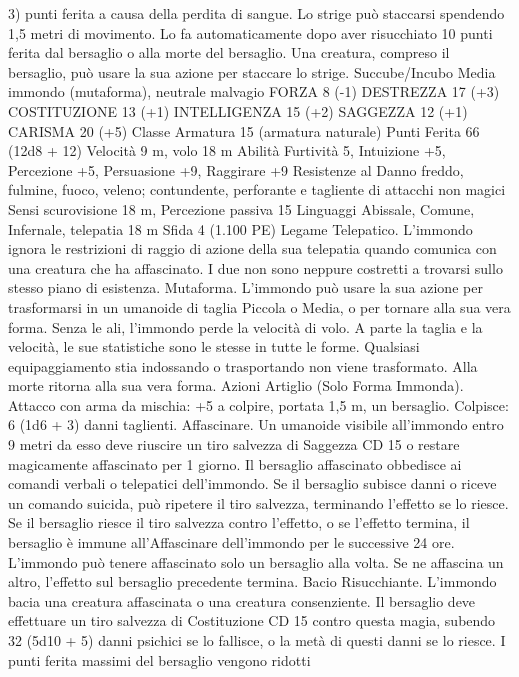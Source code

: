\begin{multicols}{2}
3) punti ferita a causa della perdita di sangue.
Lo strige può staccarsi spendendo 1,5 metri di movimento. Lo fa
automaticamente dopo aver risucchiato 10 punti ferita dal
bersaglio o alla morte del bersaglio. Una creatura, compreso il
bersaglio, può usare la sua azione per staccare lo strige.
Succube/Incubo
Media immondo (mutaforma), neutrale malvagio
FORZA 8 (-1)
DESTREZZA 17 (+3)
COSTITUZIONE 13 (+1)
INTELLIGENZA 15 (+2)
SAGGEZZA 12 (+1)
CARISMA 20 (+5)
Classe Armatura 15 (armatura naturale)
Punti Ferita 66 (12d8 + 12)
Velocità 9 m, volo 18 m
Abilità Furtività 5, Intuizione +5, Percezione +5, Persuasione
+9, Raggirare +9
Resistenze al Danno freddo, fulmine, fuoco, veleno;
contundente, perforante e tagliente di attacchi non magici
Sensi scurovisione 18 m, Percezione passiva 15
Linguaggi Abissale, Comune, Infernale, telepatia 18 m
Sfida 4 (1.100 PE)
Legame Telepatico. L’immondo ignora le restrizioni di raggio di
azione della sua telepatia quando comunica con una creatura che
ha affascinato. I due non sono neppure costretti a trovarsi sullo
stesso piano di esistenza.
Mutaforma. L’immondo può usare la sua azione per trasformarsi
in un umanoide di taglia Piccola o Media, o per tornare alla sua
vera forma. Senza le ali, l’immondo perde la velocità di volo. A
parte la taglia e la velocità, le sue statistiche sono le stesse in
tutte le forme. Qualsiasi equipaggiamento stia indossando o
trasportando non viene trasformato. Alla morte ritorna alla sua
vera forma.
Azioni
Artiglio (Solo Forma Immonda). Attacco con arma da mischia:
+5 a colpire, portata 1,5 m, un bersaglio.
Colpisce: 6 (1d6 + 3) danni taglienti.
Affascinare. Un umanoide visibile all’immondo entro 9 metri da
esso deve riuscire un tiro salvezza di Saggezza CD 15 o restare
magicamente affascinato per 1 giorno. Il bersaglio affascinato
obbedisce ai comandi verbali o telepatici dell’immondo. Se il
bersaglio subisce danni o riceve un comando suicida, può
ripetere il tiro salvezza, terminando l’effetto se lo riesce. Se il
bersaglio riesce il tiro salvezza contro l’effetto, o se l’effetto
termina, il bersaglio è immune all’Affascinare dell’immondo per
le successive 24 ore.
L’immondo può tenere affascinato solo un bersaglio alla volta.
Se ne affascina un altro, l’effetto sul bersaglio precedente
termina.
Bacio Risucchiante. L’immondo bacia una creatura affascinata o
una creatura consenziente. Il bersaglio deve effettuare un tiro
salvezza di Costituzione CD 15 contro questa magia, subendo 32
(5d10 + 5) danni psichici se lo fallisce, o la metà di questi danni
se lo riesce. I punti ferita massimi del bersaglio vengono ridotti

\end{multicols}
